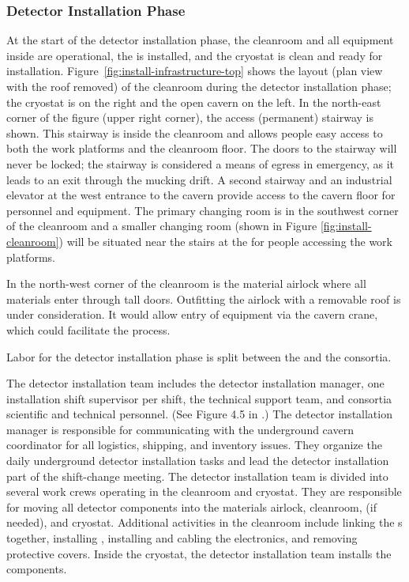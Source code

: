 \subsubsection{Detector Installation Phase}
\label{sec:fdsp-tc-inst-execute}



At the start of the detector installation phase, the cleanroom and all equipment inside are operational, the  is installed, and the cryostat is clean and ready for installation. 
Figure~\ref{fig:install-infrastructure-top} shows the layout (plan view with the roof removed) of the cleanroom during the detector installation phase; the cryostat is on the right and the open cavern on the left. 
In the north-east corner of the figure (upper right corner), the access  (permanent) stairway is shown. 
This stairway is inside the cleanroom and allows people easy access to both the work platforms and the cleanroom floor. 
The doors to the stairway will never be locked; the stairway is considered a means of egress in emergency, as it leads to an exit through the mucking drift.
A second stairway and an industrial elevator at the west entrance to the cavern provide access to the cavern floor for personnel and equipment. 
The primary changing room is in the southwest corner of the cleanroom and a smaller changing room (shown in Figure \ref{fig:install-cleanroom}) will be situated near the stairs at the  for people accessing the work platforms.

In the north-west corner of the cleanroom is the material airlock where all materials enter  through tall doors. 
Outfitting the airlock with a removable roof is under consideration. 
It would allow entry of equipment via the cavern crane, which could facilitate the process.
 
Labor for the detector installation phase is split between the  and the  consortia. 

The  detector installation team includes the  detector installation manager, one installation shift supervisor per shift, the  technical support team, and  consortia scientific and technical personnel. (See Figure 4.5 in \tcchjpo{}.) The detector installation manager is responsible for communicating with the underground cavern
coordinator for all logistics, shipping, and inventory issues. They organize the daily underground detector installation tasks and lead the detector installation part of the shift-change meeting. The detector installation team is divided into several work crews operating in the cleanroom and cryostat. They are responsible for moving all detector components into the materials airlock, cleanroom, \coldbox  (if needed), and cryostat. Additional activities in the cleanroom include linking the s together, installing , installing and cabling the electronics, and removing   protective covers. Inside the cryostat, the detector installation team installs the   components. 

